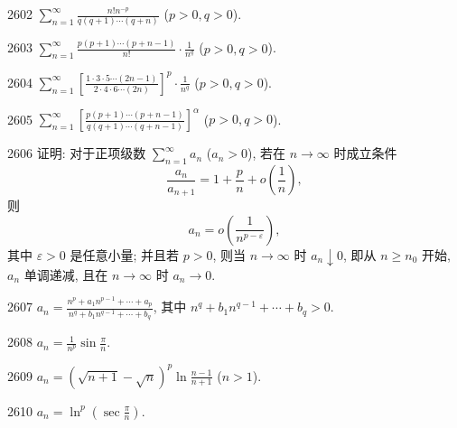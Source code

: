 \begin{prob}[S]{2602}
$\sum_{n=1}^{\infty} \frac{n! n^{-p}}{q(q+1)\cdots(q+n)}$ ($p > 0, q > 0$).
\end{prob}

\begin{prob}[S]{2603}
$\sum_{n=1}^{\infty} \frac{p(p+1)\cdots(p+n-1)}{n!} \cdot \frac{1}{n^q}$ ($p > 0, q > 0$).
\end{prob}

\begin{prob}[S]{2604}
$\sum_{n=1}^{\infty} \left[\frac{1 \cdot 3 \cdot 5 \cdots (2n-1)}{2 \cdot 4 \cdot 6 \cdots (2n)}\right]^p \cdot \frac{1}{n^q}$ ($p > 0, q > 0$).
\end{prob}

\begin{prob}[S]{2605}
$\sum_{n=1}^{\infty} \left[\frac{p(p+1)\cdots(p+n-1)}{q(q+1)\cdots(q+n-1)}\right]^{\alpha}$ ($p > 0, q > 0$).
\end{prob}

\begin{prob}[M]{2606}
证明: 对于正项级数 $\sum_{n=1}^{\infty} a_n$ ($a_n > 0$), 若在 $n \to \infty$ 时成立条件
\[
\frac{a_n}{a_{n+1}} = 1 + \frac{p}{n} + o\left(\frac{1}{n}\right),
\]
则
\[
a_n = o\left(\frac{1}{n^{p-\varepsilon}}\right),
\]
其中 $\varepsilon > 0$ 是任意小量; 并且若 $p > 0$, 则当 $n \to \infty$ 时 $a_n \downarrow 0$, 即从 $n \geqslant n_0$ 开始, $a_n$ 单调递减, 且在 $n \to \infty$ 时 $a_n \to 0$.
\end{prob}


\begin{prob}[S]{2607}
$a_n = \frac{n^p + a_1 n^{p-1} + \cdots + a_p}{n^q + b_1 n^{q-1} + \cdots + b_q}$, 其中 $n^q + b_1 n^{q-1} + \cdots + b_q > 0$.
\end{prob}

\begin{prob}[S]{2608}
$a_n = \frac{1}{n^p} \sin \frac{\pi}{n}$.
\end{prob}

\begin{prob}[S]{2609}
$a_n = (\sqrt{n+1} - \sqrt{n})^p \ln \frac{n-1}{n+1}$ ($n > 1$).
\end{prob}

\begin{prob}[S]{2610}
$a_n = \ln^p \left(\sec \frac{\pi}{n}\right)$.
\end{prob}

